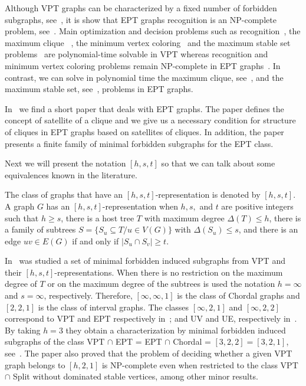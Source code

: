 Although VPT graphs can be characterized by a fixed number of forbidden subgraphs, see~\cite{leveque2009characterizing}, it is show that EPT graphs recognition is an NP-complete problem, see~\cite{golumbic1985}. Main optimization and decision problems such as recognition~\cite{gavril1978recognition}, the maximum clique~\cite{gavril2000maximum} , the minimum vertex coloring~\cite{golumbic2004algorithmic}  and the maximum stable set problems~\cite{spinrad1995algorithms} are polynomial-time solvable in VPT whereas recognition and minimum vertex coloring problems remain NP-complete in EPT graphs~\cite{golumbic1985edge}. In contrast, we can solve in polynomial time the maximum clique,
see~\cite{golumbic1985}, and the maximum stable set, see~\cite{tarjan1985decomposition},  problems in EPT graphs. 

In~\citet{alcon2010necessary} we find a short paper that deals with EPT graphs. The paper defines the concept of satellite of a clique and we give us a necessary condition for structure of cliques in EPT graphs based on satellites of cliques. In addition, the paper presents a finite family of minimal forbidden subgraphs for the EPT class.

Next we will present the notation $[h,s,t]$ so that we can talk about some equivalences known in the literature.


The class of graphs that have an $[h,s,t]$-representation is denoted by $[h,s,t]$. A graph $G$ has an $[h,s,t]$-representation  when $h,s,$ and $t$ are positive integers such that $h \geq s$, there is a host tree $T$ with maximum degree $\Delta(T) \leq h$, there is a family of subtrees $S = \{S_u \subseteq T / u\in V(G) \}$ with $\Delta(S_u)\leq s$, and there is an edge $uv \in E(G)$ if and only if $|S_u \cap S_v|\geq t$.    

In~\citet{alcon2015characterizing} was studied a set of minimal forbidden induced subgraphs from VPT and their $[h,s,t]$-representations.
When there is no restriction on the maximum degree of $T$ or on the maximum degree of the subtrees is used the notation $h=\infty $  and $s=\infty$,  respectively. Therefore, $[\infty, \infty, 1]$ is the class of Chordal graphs and $[2, 2, 1]$ is the class of interval graphs. The classes $[\infty, 2, 1]$ and $[\infty, 2, 2]$ correspond to VPT and EPT respectively in~\cite{golumbic1985edge}; and UV and UE, respectively in~\cite{monma1986intersection}.
By taking $h=3$ they obtain a characterization by minimal forbidden induced subgraphs of the class VPT $\cap$ EPT = EPT $\cap$ Chordal = $[3,2,2] = [3,2,1]$, see~\citet{golumbic1985edge}. The paper also proved that the problem of deciding whether a given VPT graph belongs to $[h,2,1]$ is NP-complete even when restricted to the class VPT $ \cap $ Split without dominated stable vertices, among other minor results.


